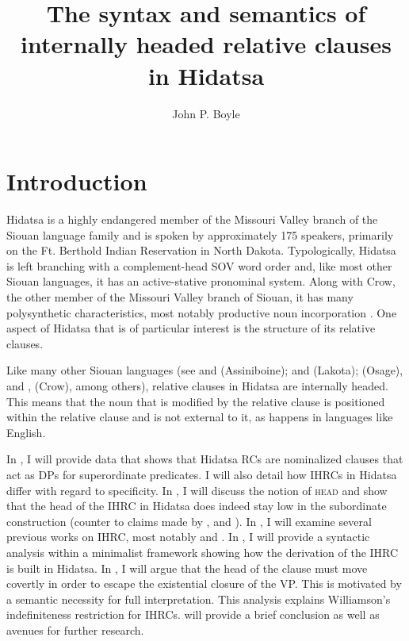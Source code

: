 \documentclass[output=paper]{LSP/langsci}
\author{John P. Boyle}
\title{The syntax and semantics of internally headed relative clauses in Hidatsa}
\begin{document}
\section{Introduction}  

Hidatsa is a highly endangered member of the Missouri Valley branch of the Siouan language family and is spoken by approximately 175 speakers, primarily on the Ft. Berthold Indian Reservation in North Dakota. Typologically, Hidatsa is left branching with a complement-head SOV word order and, like most other Siouan languages, it has an active-stative pronominal system. Along with Crow, the other member of the Missouri Valley branch of Siouan, it has many polysynthetic characteristics, most notably productive noun incorporation \citep{Rankinetal2003, Boyle2007}. One aspect of Hidatsa that is of particular interest is the structure of its relative clauses.
	
Like many other Siouan languages (see \citealt{Drummond1976} and \citealt{Cumberland2005} (Assiniboine); \citealt{Williamson1987} and \citealt{RoodTaylor1996} (Lakota); \citealt{Quintero2004} (Osage), and \citealt{Graczyk1991b}, \citeyear{Graczyk2007} (Crow), among others), relative clauses in Hidatsa are internally headed. This means that the noun that is modified by the relative clause is positioned within the relative clause and is not external to it, as happens in languages like English.
	
In , I will provide data that shows that Hidatsa RCs are nominalized clauses that act as DPs for superordinate predicates. I will also detail how IHRCs in Hidatsa differ with regard to specificity. In , I will discuss the notion of \textsc{head} and show that the head of the IHRC in Hidatsa does indeed stay low in the subordinate construction (counter to claims made by \citet{Kayne1994}, \citet{Bianchi1999} and \citet{DiSciullo2005}). In , I will examine several previous works on IHRC, most notably \citet{Williamson1987} and \citet{Culy1990}. In , I will provide a syntactic analysis within a minimalist framework showing how the derivation of the IHRC is built in Hidatsa. In , I will argue that the head of the clause must move covertly in order to escape the existential closure of the VP. This is motivated by a semantic necessity for full interpretation. This analysis explains Williamson's indefiniteness restriction for IHRCs.  will provide a brief conclusion as well as avenues for further research.
\end{document}
